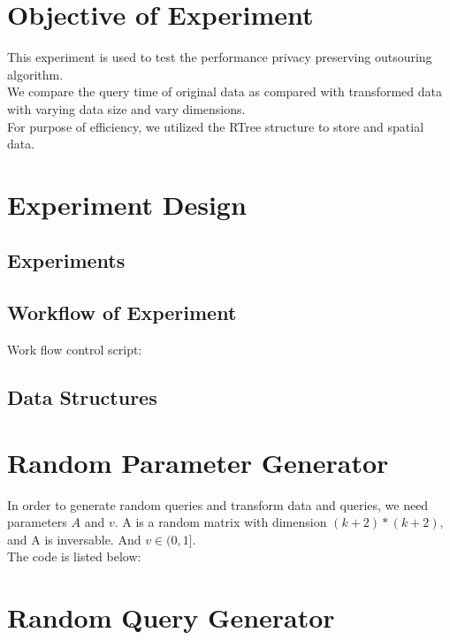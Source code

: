 \documentclass{article}
\begin{document}
\tableofcontents
\newpage

\section{Objective of Experiment}
This experiment is used to test the performance privacy preserving
outsouring algorithm. \\
We compare the query time of original data as compared with
transformed data with varying data size and vary dimensions. \\
For purpose of efficiency, we utilized the RTree structure to store
and spatial data. 

\section{Experiment Design}
\subsection{Experiments}


\subsection{Workflow of Experiment}
Work flow control script:


\subsection{Data Structures}


\section{Random Parameter Generator}
In order to generate random queries and transform data and queries, we
need parameters $A$ and $v$.  
A is a random matrix with dimension $(k+2)*(k+2)$, and A is
inversable. And $v\in(0,1]$. \\ 
The code is listed below: \\


\section{Random Query Generator}

\end{document}
